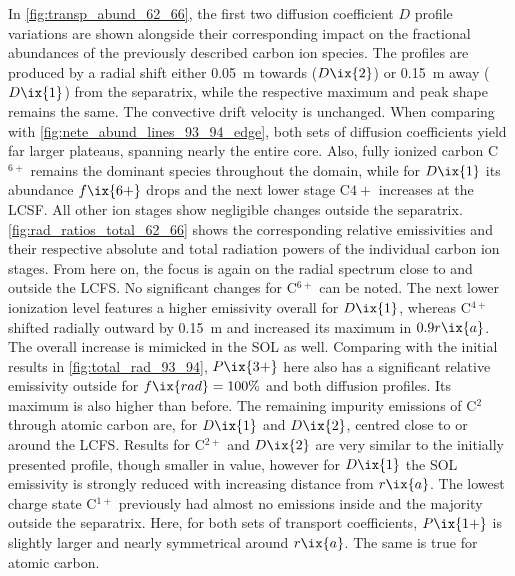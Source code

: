                 In \cref{fig:transp_abund_62_66}, the first two diffusion coefficient $D$ profile variations are shown alongside their corresponding impact on the fractional abundances of the previously described carbon ion species. The profiles are produced by a radial shift either \SI{0.05}{\meter} towards ($D\ix{2}$) or \SI{0.15}{\meter} away ($D\ix{1}$) from the separatrix, while the respective maximum and peak shape remains the same. The convective drift velocity is unchanged. When comparing with \cref{fig:nete_abund_lines_93_94_edge}, both sets of diffusion coefficients yield far larger plateaus, spanning nearly the entire core. Also, fully ionized carbon C$^{6+}$ remains the dominant species throughout the domain, while for $D\ix{1}$ its abundance $f\ix{6+}$ drops and the next lower stage C${4+}$ increases at the LCSF. All other ion stages show negligible changes outside the separatrix. \autoref{fig:rad_ratios_total_62_66} shows the corresponding relative emissivities and their respective absolute and total radiation powers of the individual carbon ion stages. From here on, the focus is again on the radial spectrum close to and outside the LCFS. No significant changes for C$^{6+}$ can be noted. The next lower ionization level features a higher emissivity overall for $D\ix{1}$, whereas C$^{4+}$ shifted radially outward by \SI{0.15}{\meter} and increased its maximum in $0.9r\ix{a}$. The overall increase is mimicked in the SOL as well. Comparing with the initial results in \cref{fig:total_rad_93_94}, $P\ix{3+}$ here also has a significant relative emissivity outside for $f\ix{rad}=100\%$ and both diffusion profiles. Its maximum is also higher than before. The remaining impurity emissions of C$^{2}$ through atomic carbon are, for $D\ix{1}$ and $D\ix{2}$, centred close to or around the LCFS. Results for C$^{2+}$ and $D\ix{2}$ are very similar to the initially presented profile, though smaller in value, however for $D\ix{1}$ the SOL emissivity is strongly reduced with increasing distance from $r\ix{a}$. The lowest charge state C$^{1+}$ previously had almost no emissions inside and the majority outside the separatrix. Here, for both sets of transport coefficients, $P\ix{1+}$ is slightly larger and nearly symmetrical around $r\ix{a}$. The same is true for atomic carbon.\\%
%
